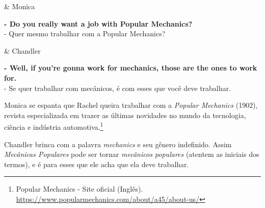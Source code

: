 \begin{tcolorbox}[enhanced,center upper,
    drop fuzzy shadow southeast, boxrule=0.3pt,
    lower separated=false, breakable,
    colframe=black!30!dialogoBorder,colback=white]
\begin{minipage}[c]{0.16\linewidth}
   & \centering \scriptsize{Monica}
\end{minipage}
\hfill
\begin{minipage}[c]{0.8\linewidth}
  \textbf{- Do you really want a job with Popular Mechanics?}\\
  - Quer mesmo trabalhar com a Popular Mechanics?
\end{minipage}

\medskip
\begin{minipage}[c]{0.16\linewidth}
   & \centering \scriptsize{Chandler}
\end{minipage}
\hfill
\begin{minipage}[c]{0.8\linewidth}
  \textbf{- Well, if you're gonna work for mechanics, those are the ones to work for.}\\
  - Se quer trabalhar com mecânicos, é com esses que você deve trabalhar.
\end{minipage}
\end{tcolorbox}

Monica se espanta que Rachel queira trabalhar com a \emph{Popular
Mechanics} (1902), revista especializada em trazer as últimas novidades
no mundo da tecnologia, ciência e indústria automotiva.\footnote{\sloppy Popular Mechanics - Site oficial (Inglês). \url{https://www.popularmechanics.com/about/a45/about-us/}}

Chandler brinca com a palavra \emph{mechanics} e seu gênero indefinido.
Assim \emph{Mecânicas Populares} pode ser tornar \emph{mecânicos
populares} (atentem as iniciais dos termos), e é para esses que ele acha
que ela deve trabalhar.

